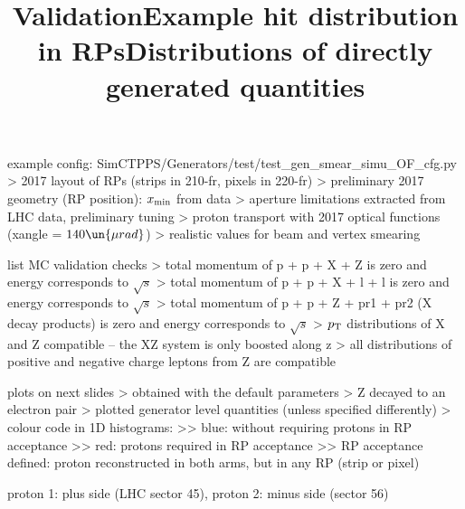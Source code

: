 \> example config: SimCTPPS/Generators/test/test\_gen\_smear\_simu\_OF\_cfg.py
\>> 2017 layout of RPs (strips in 210-fr, pixels in 220-fr)
\>> preliminary 2017 geometry (RP position): $x_{\rm min}$ from data
\>> aperture limitations extracted from LHC data, preliminary tuning
\>> proton transport with 2017 optical functions (xangle = $140\un{\mu rad}$)
\>> realistic values for beam and vertex smearing


\newpage %
\title{Validation}

\> list MC validation checks
\>> total momentum of p + p + X + Z is zero and energy corresponds to $\sqrt s$
\>> total momentum of p + p + X + l + l is zero and energy corresponds to $\sqrt s$
\>> total momentum of p + p + Z + pr1 + pr2 (X decay products) is zero and energy corresponds to $\sqrt s$
\>> $p_{\rm T}$ distributions of X and Z compatible -- the XZ system is only boosted along z
\>> all distributions of positive and negative charge leptons from Z are compatible

\> plots on next slides
\>> obtained with the default parameters
\>> Z decayed to an electron pair
\>> plotted generator level quantities (unless specified differently)
\>> colour code in 1D histograms:
\>>> blue: without requiring protons in RP acceptance
\>>> red: protons required in RP acceptance
\>>> RP acceptance defined: proton reconstructed in both arms, but in any RP (strip or pixel)


\newpage %
\title{Example hit distribution in RPs}

\centerline{}


\newpage %
\title{Distributions of directly generated quantities}

\centerline{}

\newpage %

\> proton 1: plus side (LHC sector 45), proton 2: minus side (sector 56)

\centerline{}


\newpage %

